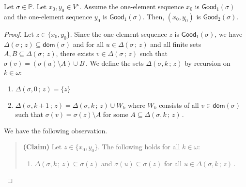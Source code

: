 \documentclass[10pt,a4paper]{amsart}
\begin{document}
 \begin{lemma}    \label{SecondLemmaGood}
 Let  $  \sigma  \in  \mathbb{P} $. 
Let  $  x_0, y_0  \in  V^{  \star }  $. 
Assume the one-element sequence $  x_0$  is  $  \mathsf{Good}_1  \left(  \sigma \right) $
and   the one-element sequence $  y_0$  is  $  \mathsf{Good}_1  \left(  \sigma \right) $. 
Then,  $  (x_0,  y_0)  $  is     $  \mathsf{Good}_2  \left(  \sigma \right) $. 
 \end{lemma}

\begin{proof}

Let  $  z  \in  \lbrace  x_0, y_0  \rbrace $. 
Since the one-element sequence $z $  is  $   \mathsf{Good}_1  \left(  \sigma  \right)  $, 
we have  $    \Delta \left(  \sigma   \,  ;   \,   z  \right)    \subseteq     \mathsf{dom} \left(  \sigma  \right)   $  
and for all $  u  \in    \Delta \left(  \sigma   \,  ;   \,   z  \right)    $  and  all finite  sets  $  A , B \subseteq   \Delta \left(  \sigma   \,  ;   \,   z  \right)   $, 
there exists  $  v  \in    \Delta \left(  \sigma   \,  ;   \,   z  \right)    $  such that  
$  \sigma (v)  =   \left(   \sigma (u)  \setminus   A   \right)  \cup   B      \,     $. 
We define the sets  $  \Delta \left(  \sigma , k  \,  ;   \,   z  \right)  $  by recursion on  $ k  \in  \omega   $: 
\begin{enumerate}
\item  $  \Delta \left(  \sigma , 0 \,  ;   \,   z  \right)   =  \lbrace   z  \rbrace $ 




\item   $  \Delta \left(  \sigma , k +1  \,  ;   \,   z  \right)   =   \Delta \left(  \sigma , k  \,  ;   \,   z  \right)   \cup  W_k  $ 
where  $  W_k $  consists of all $  v  \in  \mathsf{dom} \left(  \sigma  \right)  $  such that 
$  \sigma (v)  =    \sigma (z)  \setminus  A   $  for some  $  A  \subseteq     \Delta \left(  \sigma , k  \,  ;   \,   z \right)        \,    $.
\end{enumerate} 
We   have the following observation. 







  \begin{quote} {\bf (Claim)} \;\;\;\;\;\;    
  Let   $   z  \in    \lbrace  x_0,  y_0  \rbrace   $. 
  The following holds for all  $  k  \in   \omega   $: 
  \begin{enumerate}
  \item    $    \Delta \left(  \sigma , k   \,  ;   \,   z  \right)     \subseteq   \sigma (z)       $
  and  $  \sigma (u)  \subseteq   \sigma (z)  $  for all  $  u \in       \Delta \left(  \sigma , k   \,  ;   \,   z  \right)     \,    $. 
  

\end{enumerate}
\end{quote}
\end{proof}
\end{document}
